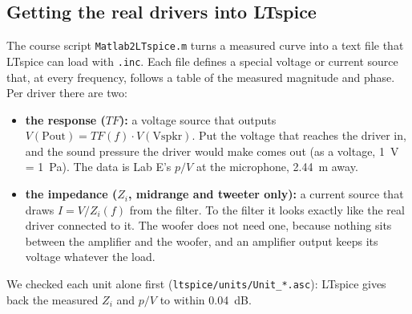\documentclass[a4paper,10pt]{article}
\newcommand{\file}[1]{\nolinkurl{#1}}
\begin{document}
\subsection{Getting the real drivers into LTspice}
The course script \file{Matlab2LTspice.m} turns a measured curve into a text file that LTspice can
load with \file{.inc}. Each file defines a special voltage or current source that, at every
frequency, follows a table of the measured magnitude and phase. Per driver there are two:
\begin{itemize}
\item \textbf{the response ($TF$):} a voltage source that outputs $V(\mathrm{Pout}) = TF(f)\cdot
  V(\mathrm{Vspkr})$. Put the voltage that reaches the driver in, and the sound pressure the driver
  would make comes out (as a voltage, 1~V = 1~Pa). The data is Lab E's $p/V$ at the microphone,
  \SI{2.44}{m} away.
\item \textbf{the impedance ($Z_i$, midrange and tweeter only):} a current source that draws
  $I = V/Z_i(f)$ from the filter. To the filter it looks exactly like the real driver connected to it.
  The woofer does not need one, because nothing sits between the amplifier and the woofer, and an
  amplifier output keeps its voltage whatever the load.
\end{itemize}
We checked each unit alone first (\file{ltspice/units/Unit_*.asc}): LTspice gives back the measured
$Z_i$ and $p/V$ to within \SI{0.04}{dB}.
\end{document}
